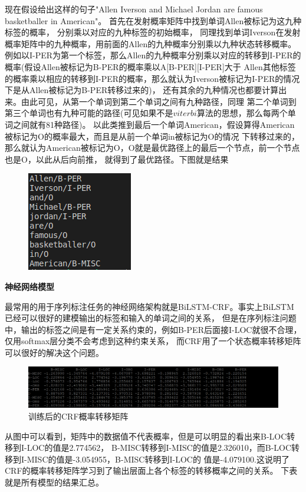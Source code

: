 \documentclass[openany,oneside]{ctexbook}
\begin{document}
现在假设给出这样的句子"Allen Iverson and Michael Jordan are famous basketballer in American"。
首先在发射概率矩阵中找到单词Allen被标记为这九种标签的概率，
分别乘以对应的九种标签的初始概率，
同理找到单词Iverson在发射概率矩阵中的九种概率，用前面的Allen的九种概率分别乘以九种状态转移概率。
例如以I-PER为第一个标签，那么Allen的九种概率分别乘以对应的转移到I-PER的概率(假设Allen被标记为B-PER的概率乘以A[B-PER][I-PER]大于
Allen其他标签的概率乘以相应的转移到I-PER的概率，那么就认为Iverson被标记为I-PER的情况下是从Allen被标记为B-PER转移过来的)，
还有其余的九种情况也都要计算出来。由此可见，从第一个单词到第二个单词之间有九种路径，同理
第二个单词到第三个单词也有九种可能的路径(可见如果不是$viterbi$算法的思想，那么每两个单词之间就有81种路径)。
以此类推到最后一个单词American，假设算得American被标记为O的概率最大，而且是从前一个单词in被标记为O的情况
下转移过来的，那么就认为American被标记为O，O就是最优路径上的最后一个节点，前一个节点也是O，以此从后向前推，
就得到了最优路径。下图就是结果
\begin{figure}[htp]
   \centering
   \includegraphics[scale=1.2]{print.png}
   
\end{figure}


{\bfseries 神经网络模型}

最常用的用于序列标注任务的神经网络架构就是BiLSTM-CRF。事实上BiLSTM已经可以很好的建模输出的标签和输入的单词之间的关系，
但是在序列标注问题中，输出的标签之间是有一定关系约束的，例如B-PER后面接I-LOC就很不合理，仅用softmax层分类不会考虑到这种约束关系，
而CRF用了一个状态概率转移矩阵可以很好的解决这个问题。
\begin{figure}[H]
   \centering
   \includegraphics[scale=0.5]{trans_matrix.png}
   \caption{训练后的CRF概率转移矩阵}
\end{figure}
从图中可以看到，矩阵中的数据值不代表概率，但是可以明显的看出来B-LOC转移到I-LOC的值是2.774562，
B-MISC转移到I-MISC的值是2.326010，而B-LOC转移到I-MISC的值是-3.054955，B-MISC转移到I-LOC的
值是-4.079100.这说明了CRF的概率转移矩阵学习到了输出层面上各个标签的转移概率之间的关系。
下表就是所有模型的结果汇总。
\end{document}

